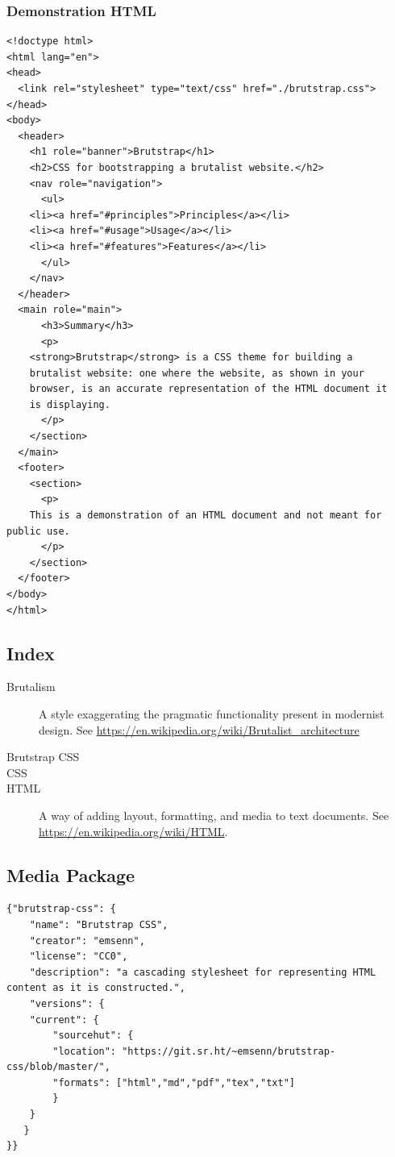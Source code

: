 \documentclass[11pt]{article}
\begin{document}
\subsubsection*{Demonstration HTML}
\label{sec:org96bdd34}
\begin{verbatim}
<!doctype html>
<html lang="en">
<head>
  <link rel="stylesheet" type="text/css" href="./brutstrap.css">
</head>
<body>
  <header>
    <h1 role="banner">Brutstrap</h1>
    <h2>CSS for bootstrapping a brutalist website.</h2>
    <nav role="navigation">
      <ul>
	<li><a href="#principles">Principles</a></li>
	<li><a href="#usage">Usage</a></li>
	<li><a href="#features">Features</a></li>
      </ul>
    </nav>
  </header>
  <main role="main">
      <h3>Summary</h3>
      <p>
	<strong>Brutstrap</strong> is a CSS theme for building a
	brutalist website: one where the website, as shown in your
	browser, is an accurate representation of the HTML document it
	is displaying.
      </p>
    </section>
  </main>
  <footer>
    <section>
      <p>
	This is a demonstration of an HTML document and not meant for public use.
      </p>
    </section>
  </footer>
</body>
</html>
\end{verbatim}
\subsection*{Index}
\label{sec:org3c7d91b}
\begin{description}
\item[{Brutalism}] A style exaggerating the pragmatic functionality present in modernist design. See \href{https://en.wikipedia.org/wiki/Brutalist\_architecture}{https://en.wikipedia.org/wiki/Brutalist\_architecture}
\item[{Brutstrap CSS}]

\item[{CSS}]

\item[{HTML}] A way of adding layout, formatting, and media to text documents. See \href{https://en.wikipedia.org/wiki/HTML}{https://en.wikipedia.org/wiki/HTML}.
\end{description}
\subsection*{Media Package}
\label{sec:orgca86108}
\begin{verbatim}
{"brutstrap-css": {
    "name": "Brutstrap CSS",
    "creator": "emsenn",
    "license": "CC0",
    "description": "a cascading stylesheet for representing HTML content as it is constructed.",
    "versions": {
	"current": {
	    "sourcehut": {
		"location": "https://git.sr.ht/~emsenn/brutstrap-css/blob/master/",
		"formats": ["html","md","pdf","tex","txt"]
	    }
	}
   }
}}
\end{verbatim}
\end{document}
